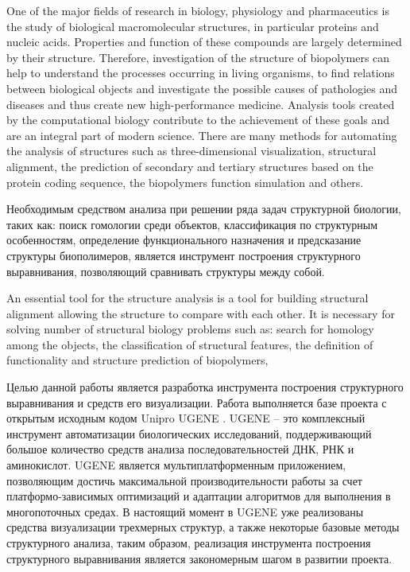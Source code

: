\documentclass[a4paper, 12pt, titlepage, utf8]{extarticle}
\begin{document}
One of the major fields of research in biology, physiology and pharmaceutics is
the study of biological macromolecular structures, in particular proteins and
nucleic acids. Properties and function of these compounds are largely determined
by their structure. Therefore, investigation of the structure of biopolymers can
help to understand the processes occurring in living organisms, to find
relations between biological objects and investigate the possible causes of
pathologies and diseases and thus create new high-performance medicine. Analysis
tools created by the computational biology contribute to the achievement of
these goals and are an integral part of modern science. There are many methods
for automating the analysis of structures such as three-dimensional
visualization, structural alignment, the prediction of secondary and tertiary
structures based on the protein coding sequence, the biopolymers function
simulation and others.

\begin{original}
Необходимым средством анализа при решении ряда задач структурной биологии, таких
как: поиск гомологии среди объектов, классификация по структурным особенностям,
определение функционального назначения и предсказание структуры биополимеров,
является инструмент построения структурного выравнивания, позволяющий сравнивать
структуры между собой.
\end{original}

An essential tool for the structure analysis is a tool for building structural
alignment allowing the structure to compare with each other. It is necessary
for solving number of structural biology problems such as: search for homology
among the objects, the classification of structural features, the definition of
functionality and structure prediction of biopolymers,

\begin{original}
Целью данной работы является разработка инструмента построения структурного
выравнивания и средств его визуализации. Работа выполняется базе проекта с
открытым исходным кодом Unipro UGENE \cite{ugene}. UGENE -- это комплексный
инструмент автоматизации биологических исследований, поддерживающий большое
количество средств анализа последовательностей ДНК, РНК и аминокислот. UGENE
является мультиплатформенным приложением, позволяющим достичь максимальной
производительности работы за счет платформо-зависимых оптимизаций и адаптации
алгоритмов для выполнения в многопоточных средах. В настоящий момент в UGENE уже
реализованы средства визуализации трехмерных структур, а также некоторые базовые
методы структурного анализа, таким образом, реализация инструмента построения
структурного выравнивания является закономерным шагом в развитии проекта.
\end{original}
\end{document}
